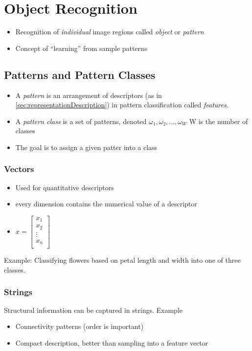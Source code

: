 \section{Object Recognition}
\begin{itemize}
\item Recognition of \emph{individual} image regions called \emph{object} or \emph{pattern}
\item Concept of ``learning'' from sample patterns
\end{itemize}

\subsection{Patterns and Pattern Classes}
\begin{itemize}
	\item A \emph{pattern} is an arrangement of descriptors
		(as in \ref{sec:representationDescription}) in pattern classification
		called \emph{features}.
	\item A \emph{pattern class} is a set of patterns, denoted $\omega_1, \omega_2, ..., \omega_W$ W is the number of classes
	\item The goal is to assign a given patter into a class
\end{itemize}

\subsubsection{Vectors}
\begin{itemize}
	\item Used for quantitative descriptors
	\item every dimension contains the numerical value of a descriptor
	\item $x =
		\begin{bmatrix}
			x_1 \\
			x_2 \\
			\vdots \\
			x_n \\
		\end{bmatrix}$
\end{itemize}
Example: Classifying flowers based on petal length and width into one of three
classes.

\subsubsection{Strings}
Structural information can be captured in strings. Example
\begin{itemize}
	\item Connectivity patterns (order is important)
	\item Compact description, better than sampling into a feature vector
\end{itemize}

